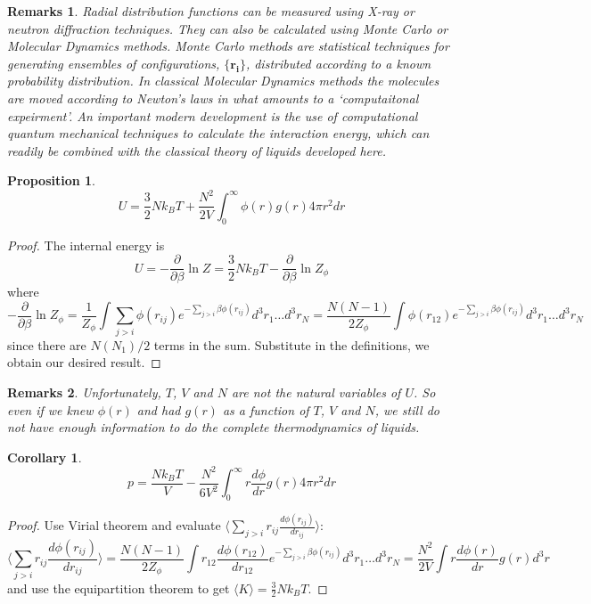\documentclass[a4paper]{article}
\newtheorem{remarks}{Remarks}[section]
\theoremstyle{new}
\newtheorem{prop}{Proposition}[section]
\newtheorem{cor}{Corollary}[section]
\begin{document}
\begin{remarks}
Radial distribution functions can be measured using X-ray or neutron diffraction techniques. They can also be calculated using Monte Carlo or Molecular Dynamics methods. Monte Carlo methods are statistical techniques for generating ensembles of configurations, $\{\mathbf{r_i}\}$, distributed according to a known probability distribution. In classical Molecular Dynamics methods the molecules are moved according to Newton's laws in what amounts to a `computaitonal expeirment'. An important modern development is the use of computational quantum mechanical techniques to calculate the interaction energy, which can readily be combined with the classical theory of liquids developed here.
\end{remarks}
\begin{prop}
$$U=\frac{3}{2}Nk_BT+\frac{N^2}{2V}\int_0^\infty\phi(r)g(r)4\pi r^2dr$$
\end{prop}
\begin{proof}
The internal energy is
$$U=-\frac{\partial}{\partial\beta}\ln Z=\frac{3}{2}Nk_BT-\frac{\partial}{\partial\beta}\ln Z_\phi$$
where
$$-\frac{\partial}{\partial\beta}\ln Z_\phi=\frac{1}{Z_\phi}\int\sum_{j>i}\phi(r_{ij})e^{-\sum_{j>i}\beta\phi(r_{ij})}d^3r_1\dots d^3r_N=\frac{N(N-1)}{2Z_\phi}\int\phi(r_{12})e^{-\sum_{j>i}\beta\phi(r_{ij})}d^3r_1\dots d^3r_N$$
since there are $N(N_1)/2$ terms in the sum. Substitute in the definitions, we obtain our desired result.
\end{proof}
\begin{remarks}
Unfortunately, $T$, $V$ and $N$ are not the natural variables of $U$. So even if we knew $\phi(r)$ and had $g(r)$ as a function of $T$, $V$ and $N$, we still do not have enough information to do the complete thermodynamics of liquids.
\end{remarks}
\begin{cor}
$$p=\frac{Nk_BT}{V}-\frac{N^2}{6V^2}\int_0^\infty r\frac{d\phi}{dr}g(r)4\pi r^2dr$$
\end{cor}
\begin{proof}
Use Virial theorem and evaluate $\langle\sum_{j>i}r_{ij}\frac{d\phi(r_{ij})}{dr_{ij}}\rangle$:
$$\bigg\langle\sum_{j>i}r_{ij}\frac{d\phi(r_{ij})}{dr_{ij}}\bigg\rangle=\frac{N(N-1)}{2Z_\phi}\int r_{12}\frac{d\phi(r_{12})}{dr_{12}}e^{-\sum_{j>i}\beta\phi(r_{ij})}d^3r_1\dots d^3r_N=\frac{N^2}{2V}\int r\frac{d\phi(r)}{dr}g(r)d^3r$$
and use the equipartition theorem to get $\langle K\rangle=\frac{3}{2}Nk_BT$.
\end{proof}
\end{document}
